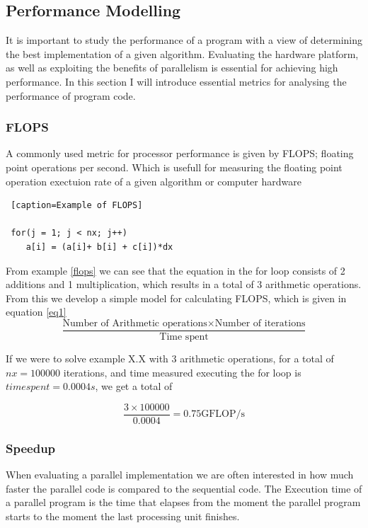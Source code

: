 
\subsection{Performance Modelling}
It is important to study the performance of a program with a view of determining the best implementation of a given algorithm. Evaluating the hardware platform, as well as exploiting the benefits of parallelism is essential for achieving high performance. In this section I will introduce essential metrics for analysing the performance of program code.

\subsubsection{FLOPS}
A commonly used metric for processor performance is given by FLOPS; floating point operations per second. Which is usefull for measuring the floating point operation exectuion rate of a given algorithm or computer hardware

\begin{lstlisting} [caption=Example of FLOPS]

 for(j = 1; j < nx; j++)
 	a[i] = (a[i]+ b[i] + c[i])*dx

\end{lstlisting}

From example \ref{flops} we can see that the equation in the for loop consists of  2 additions and 1 multiplication, which results in a total of 3 arithmetic operations. From this we develop a simple model for calculating FLOPS, which is given in equation \ref{eq1}
\begin{equation} \label{eq1}
\frac{\textrm{Number of Arithmetic operations} \times \textrm{Number of iterations}}{\textrm{Time spent}} 
\end{equation}

If we were to solve example X.X with 3 arithmetic operations, for a total of 
 \(nx = 100 000\) iterations, and time measured executing the for loop is  \(time spent = 0.0004 s\), we get a total of
 
 \begin{equation} 
\frac{3 \times 100 000}{0.0004} = 0.75 \textrm{GFLOP/s}
\end{equation}

\subsubsection{Speedup}
When evaluating a parallel implementation we are often interested in how much faster the parallel code is compared to the sequential code.
The Execution time of a parallel program is the time that elapses from the moment the parallel program starts to the moment the last processing unit finishes. 


